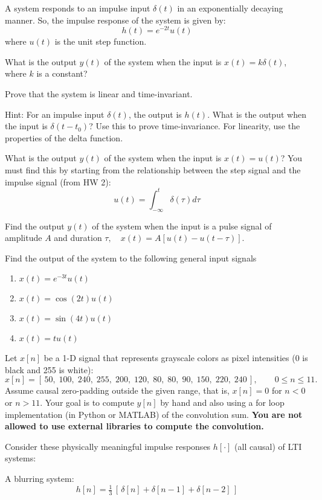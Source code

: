 \documentclass{ee102_pset}
\author{\rule{3cm}{0.4pt}} %
\begin{document}
A system responds to an impulse input $\delta(t)$ in an exponentially decaying manner. So, the impulse response of the system is given by:
\[
h(t) = e^{-2t}u(t)
\]
where $u(t)$ is the unit step function.

\problempart[5 points] What is the output $y(t)$ of the system when the input is $x(t) = k \delta(t)$, where $k$ is a constant?

\problempart[5 points] Prove that the system is linear and time-invariant. 

Hint: For an impulse input $\delta(t)$, the output is $h(t)$. What is the output when the input is $\delta(t - t_0)$? Use this to prove time-invariance. For linearity, use the properties of the delta function.

\problempart[10 points] What is the output $y(t)$ of the system when the input is $x(t) = u(t)$? You must find this by starting from the relationship between the step signal and the impulse signal (from HW 2): 
\[
u(t) = \int_{-\infty}^{t} \delta(\tau) d\tau
\]


\problempart[20 points] Find the output $y(t)$ of the system when the input is a pulse signal of amplitude $A$ and duration $\tau, \quad x(t) = A[u(t) - u(t-\tau)]$.

 Find the output of the system to the following general input signals
\begin{enumerate}
    \item $x(t) = e^{-3t}u(t)$
    \item $x(t) = \cos(2t)u(t)$
    \item $x(t) = \sin(4t)u(t)$
    \item $x(t) = t u(t)$
\end{enumerate}



Let $x[n]$ be a 1-D signal that represents grayscale colors as pixel intensities (0 is black and 255 is white):
\[
x[n] = [\,50,\;100,\;240,\;255,\;200,\;120,\;80,\;80,\;90,\;150,\;220,\;240\,],
\qquad 0\le n\le 11.
\]
Assume causal zero-padding outside the given range, that is, $x[n]=0$ for $n<0$ or $n>11$. Your goal is to compute $y[n]$ by hand and also using a for loop implementation (in Python or MATLAB) of the convolution sum. \textbf{You are not allowed to use external libraries to compute the convolution.}

Consider these physically meaningful impulse responses $h[\cdot]$ (all causal) of LTI systems:

\problempart [12 points] A blurring system:
\[
h[n]=\tfrac13\,[\,\delta[n]+\delta[n-1]+\delta[n-2]\,]
\]
\end{document}
